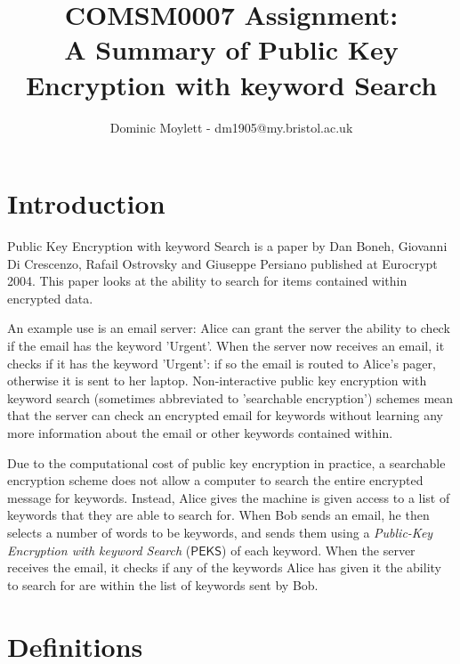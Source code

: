 \documentclass[a4paper,11pt]{article}
\title{COMSM0007 Assignment:\\A Summary of Public Key Encryption with keyword Search}
\author{Dominic Moylett - dm1905@my.bristol.ac.uk}
\begin{document}
    \maketitle

    \section{Introduction}

    Public Key Encryption with keyword Search is a paper by Dan Boneh, Giovanni Di Crescenzo, Rafail Ostrovsky and Giuseppe Persiano published at Eurocrypt 2004. This paper looks at the ability to search for items contained within encrypted data.

    An example use is an email server: Alice can grant the server the ability to check if the email has the keyword 'Urgent'. When the server now receives an email, it checks if it has the keyword 'Urgent': if so the email is routed to Alice's pager, otherwise it is sent to her laptop. Non-interactive public key encryption with keyword search (sometimes abbreviated to 'searchable encryption') schemes mean that the server can check an encrypted email for keywords without learning any more information about the email or other keywords contained within.

    Due to the computational cost of public key encryption in practice, a searchable encryption scheme does not allow a computer to search the entire encrypted message for keywords. Instead, Alice gives the machine is given access to a list of keywords that they are able to search for. When Bob sends an email, he then selects a number of words to be keywords, and sends them using a \textit{Public-Key Encryption with keyword Search} ($\mathsf{PEKS}$) of each keyword. When the server receives the email, it checks if any of the keywords Alice has given it the ability to search for are within the list of keywords sent by Bob.

    \section{Definitions}
\end{document}
